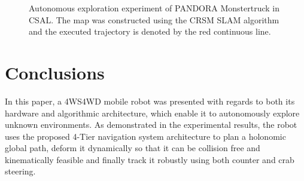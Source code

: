 \documentclass[conference]{IEEEtran}
\begin{document}
\begin{figure}[!ht]
  \centering
  \caption{Autonomous exploration experiment of PANDORA Monstertruck in CSAL. The map was constructed using the CRSM SLAM algorithm and the executed trajectory is denoted by the red continuous line.}
  \label{fig:exploration_exp}
\end{figure}


\section{Conclusions} \label{sec:conclusions}

In this paper, a 4WS4WD mobile robot was presented with regards to both its hardware and algorithmic architecture, which enable it to autonomously explore unknown environments. As demonstrated in the experimental results, the robot uses the proposed 4-Tier navigation system architecture to plan a holonomic global path, deform it dynamically so that it can be collision free and kinematically feasible and finally track it robustly using both counter and crab steering.
\end{document}
